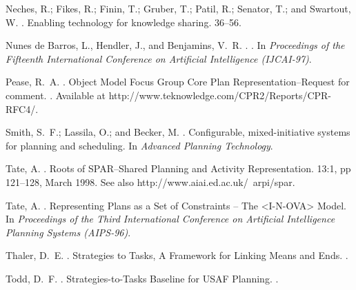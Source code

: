 \begin{thebibliography}{}
Neches, R.; Fikes, R.; Finin, T.; Gruber, T.; Patil, R.; Senator, T.; and
  Swartout, W.
.
\newblock Enabling technology for knowledge sharing.
  36--56.

Nunes de Barros, L., Hendler, J., and Benjamins, V.~R.
. 
.   
\newblock In {\em Proceedings of the Fifteenth International 
Conference on Artificial Intelligence (IJCAI-97)}.

Pease, R.~A.
.
\newblock Object Model Focus Group Core Plan Representation--Request
for comment. 
.   
Available at {http://www.teknowledge.com/CPR2/Reports/CPR-RFC4/}.  


Smith, S.~F.; Lassila, O.; and Becker, M.
.
\newblock Configurable, mixed-initiative systems for planning and scheduling.
\newblock In {\em Advanced Planning Technology}.

Tate, A.
.
\newblock Roots of SPAR--Shared Planning and Activity Representation. 
 13:1, pp 121--128, March 1998. 
See also {http://www.aiai.ed.ac.uk/~arpi/spar}.  

Tate, A.
.
\newblock Representing Plans as a Set of Constraints -- The <I-N-OVA> Model. 
\newblock In {\em Proceedings of the Third International Conference
on Artificial Intelligence Planning Systems (AIPS-96)}.

Thaler, D.~E.
.
\newblock Strategies to Tasks, A Framework for Linking Means
and Ends. 
.   

Todd, D.~F.
.
\newblock Strategies-to-Tasks Baseline for USAF Planning.
.   


\end{thebibliography}
